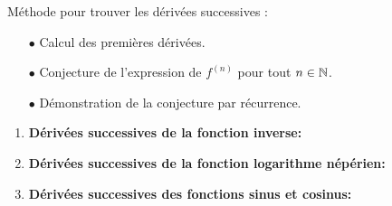\documentclass[a4paper, 11pt]{article}
\begin{document}
\vspace{0.5cm}





\begin{dboxminipage}{12cm}
	M\'ethode pour trouver les dérivées successives :
	\begin{itemize}
		\item[$\bullet$] Calcul des premi\`{e}res d\'eriv\'ees.
		\item[$\bullet$] Conjecture de l'expression de $f^{(n)}$ pour tout $n\in\mathbb{N}$.
		\item[$\bullet$] D\'emonstration de la conjecture par r\'ecurrence.
	\end{itemize}
\end{dboxminipage}

\begin{enumerate}
	\item \textbf{D\'eriv\'ees successives de la fonction inverse:}\\

	      \vspace{2cm}

	\item \textbf{D\'eriv\'ees successives de la fonction logarithme n\'ep\'erien:}\\

	      \vspace{2cm}

	\item \textbf{D\'eriv\'ees successives des fonctions sinus et cosinus:}\\

	      \vspace{2cm}

\end{enumerate}
\end{document}
